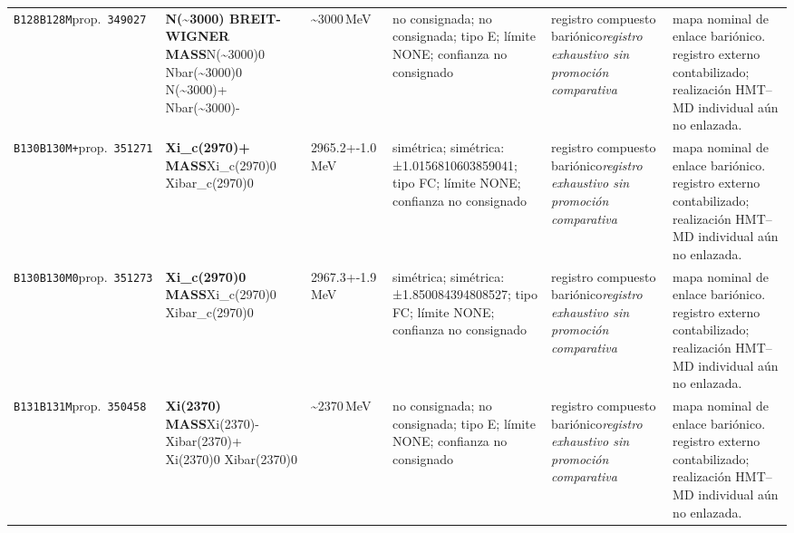 \begin{landscape}
\begin{longtable}{L{1.85cm}L{4.45cm}L{2.35cm}L{4.05cm}L{3.35cm}L{7.15cm}}
\texttt{B128}\newline \texttt{B128M}\newline prop.\ \texttt{349027} & \textbf{N(\textasciitilde{}3000) BREIT-WIGNER MASS}\newline N(\textasciitilde{}3000)0 \textbar{}\allowbreak{} Nbar(\textasciitilde{}3000)0 \textbar{}\allowbreak{} N(\textasciitilde{}3000)+ \textbar{}\allowbreak{} Nbar(\textasciitilde{}3000)- & \textasciitilde{}3000\,MeV & no consignada; no consignada; tipo E; límite NONE; confianza no consignado & registro compuesto bariónico\newline \emph{registro exhaustivo sin promoción comparativa} & mapa nominal de enlace bariónico. registro externo contabilizado; realización HMT--MD individual aún no enlazada. \\
\texttt{B130}\newline \texttt{B130M+}\newline prop.\ \texttt{351271} & \textbf{Xi\_\allowbreak{}c(2970)+ MASS}\newline Xi\_\allowbreak{}c(2970)0 \textbar{}\allowbreak{} Xibar\_\allowbreak{}c(2970)0 & 2965.2+-1.0\,MeV & simétrica; simétrica: ±1.0156810603859041; tipo FC; límite NONE; confianza no consignado & registro compuesto bariónico\newline \emph{registro exhaustivo sin promoción comparativa} & mapa nominal de enlace bariónico. registro externo contabilizado; realización HMT--MD individual aún no enlazada. \\
\texttt{B130}\newline \texttt{B130M0}\newline prop.\ \texttt{351273} & \textbf{Xi\_\allowbreak{}c(2970)0 MASS}\newline Xi\_\allowbreak{}c(2970)0 \textbar{}\allowbreak{} Xibar\_\allowbreak{}c(2970)0 & 2967.3+-1.9\,MeV & simétrica; simétrica: ±1.850084394808527; tipo FC; límite NONE; confianza no consignado & registro compuesto bariónico\newline \emph{registro exhaustivo sin promoción comparativa} & mapa nominal de enlace bariónico. registro externo contabilizado; realización HMT--MD individual aún no enlazada. \\
\texttt{B131}\newline \texttt{B131M}\newline prop.\ \texttt{350458} & \textbf{Xi(2370) MASS}\newline Xi(2370)- \textbar{}\allowbreak{} Xibar(2370)+ \textbar{}\allowbreak{} Xi(2370)0 \textbar{}\allowbreak{} Xibar(2370)0 & \textasciitilde{}2370\,MeV & no consignada; no consignada; tipo E; límite NONE; confianza no consignado & registro compuesto bariónico\newline \emph{registro exhaustivo sin promoción comparativa} & mapa nominal de enlace bariónico. registro externo contabilizado; realización HMT--MD individual aún no enlazada. \\

\end{longtable}
\end{landscape}

